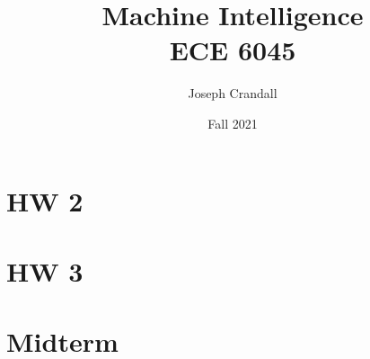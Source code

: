 
\usepackage{algorithm, algpseudocode, color, gensymb, siunitx, soul, subfiles}
\usepackage[a4paper, total={7.5in, 10in}]{geometry}

\title{Machine Intelligence\\
\large ECE 6045}
\author{Joseph Crandall}
\date{Fall 2021}


\maketitle

%

\section{HW 2}


\section{HW 3}


\section{Midterm}


%

%

%

%

%


